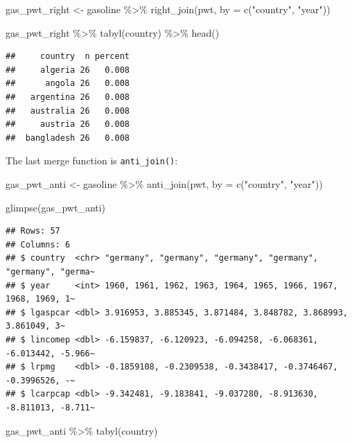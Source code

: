 \documentclass[
]{article}
\newenvironment{Shaded}{\begin{snugshade}}{\end{snugshade}}
\newcommand{\AttributeTok}[1]{\textcolor[rgb]{0.77,0.63,0.00}{#1}}
\newcommand{\FunctionTok}[1]{\textcolor[rgb]{0.00,0.00,0.00}{#1}}
\newcommand{\NormalTok}[1]{#1}
\newcommand{\OtherTok}[1]{\textcolor[rgb]{0.56,0.35,0.01}{#1}}
\newcommand{\SpecialCharTok}[1]{\textcolor[rgb]{0.00,0.00,0.00}{#1}}
\newcommand{\StringTok}[1]{\textcolor[rgb]{0.31,0.60,0.02}{#1}}
\begin{document}
\begin{Shaded}
\begin{Highlighting}[]
\NormalTok{gas\_pwt\_right }\OtherTok{\textless{}{-}}\NormalTok{ gasoline }\SpecialCharTok{\%\textgreater{}\%}
  \FunctionTok{right\_join}\NormalTok{(pwt, }\AttributeTok{by =} \FunctionTok{c}\NormalTok{(}\StringTok{"country"}\NormalTok{, }\StringTok{"year"}\NormalTok{))}

\NormalTok{gas\_pwt\_right }\SpecialCharTok{\%\textgreater{}\%}
  \FunctionTok{tabyl}\NormalTok{(country) }\SpecialCharTok{\%\textgreater{}\%}
  \FunctionTok{head}\NormalTok{()}
\end{Highlighting}
\end{Shaded}

\begin{verbatim}
##     country  n percent
##     algeria 26   0.008
##      angola 26   0.008
##   argentina 26   0.008
##   australia 26   0.008
##     austria 26   0.008
##  bangladesh 26   0.008
\end{verbatim}

The last merge function is \texttt{anti\_join()}:

\begin{Shaded}
\begin{Highlighting}[]
\NormalTok{gas\_pwt\_anti }\OtherTok{\textless{}{-}}\NormalTok{ gasoline }\SpecialCharTok{\%\textgreater{}\%}
  \FunctionTok{anti\_join}\NormalTok{(pwt, }\AttributeTok{by =} \FunctionTok{c}\NormalTok{(}\StringTok{"country"}\NormalTok{, }\StringTok{"year"}\NormalTok{))}

\FunctionTok{glimpse}\NormalTok{(gas\_pwt\_anti)}
\end{Highlighting}
\end{Shaded}

\begin{verbatim}
## Rows: 57
## Columns: 6
## $ country  <chr> "germany", "germany", "germany", "germany", "germany", "germa~
## $ year     <int> 1960, 1961, 1962, 1963, 1964, 1965, 1966, 1967, 1968, 1969, 1~
## $ lgaspcar <dbl> 3.916953, 3.885345, 3.871484, 3.848782, 3.868993, 3.861049, 3~
## $ lincomep <dbl> -6.159837, -6.120923, -6.094258, -6.068361, -6.013442, -5.966~
## $ lrpmg    <dbl> -0.1859108, -0.2309538, -0.3438417, -0.3746467, -0.3996526, -~
## $ lcarpcap <dbl> -9.342481, -9.183841, -9.037280, -8.913630, -8.811013, -8.711~
\end{verbatim}

\begin{Shaded}
\begin{Highlighting}[]
\NormalTok{gas\_pwt\_anti }\SpecialCharTok{\%\textgreater{}\%}
  \FunctionTok{tabyl}\NormalTok{(country)}
\end{Highlighting}
\end{Shaded}
\end{document}
